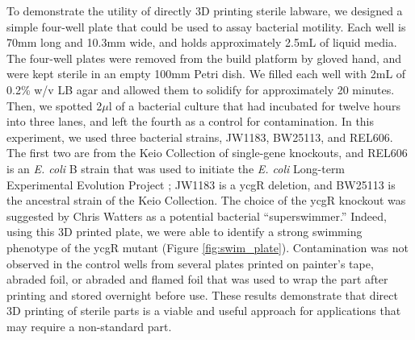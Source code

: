 \begin{refsection}
To demonstrate the utility of directly 3D printing sterile labware, we
designed a simple four-well plate that could be used to assay
bacterial motility. \cite{swimplate} Each well is 70mm long and 10.3mm
wide, and holds approximately 2.5mL of liquid media. The four-well
plates were removed from the build platform by gloved hand, and were
kept sterile in an empty 100mm Petri dish. We filled each well with
2mL of 0.2\% w/v LB agar and allowed them to solidify for
approximately 20 minutes. Then, we spotted 2$\mu$l of a bacterial
culture that had incubated for twelve hours into three lanes, and left
the fourth as a control for contamination. In this experiment, we used
three bacterial strains, JW1183, BW25113, and REL606. The first two
are from the Keio Collection of single-gene knockouts, and REL606 is
an {\em E. coli} B strain that was used to initiate the {\em E. coli}
Long-term Experimental Evolution Project \cite{lenski1991}; JW1183 is
a ycgR deletion, and BW25113 is the ancestral strain of the Keio
Collection. \cite{keio} The choice of the ycgR knockout was suggested
by Chris Watters as a potential bacterial ``superswimmer.''
\cite{WatersLabMSU2014} Indeed, using this 3D printed plate, we were
able to identify a strong swimming phenotype of the ycgR mutant
(Figure \ref{fig:swim_plate}). Contamination was not observed in the
control wells from several plates printed on painter's tape, abraded
foil, or abraded and flamed foil that was used to wrap the part after
printing and stored overnight before use. These results demonstrate
that direct 3D printing of sterile parts is a viable and useful
approach for applications that may require a non-standard part.

\begin{figure}
    \centering
    


\end{figure}
\end{refsection}

